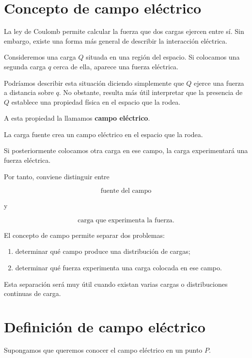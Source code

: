 \section{Concepto de campo eléctrico}

La ley de Coulomb permite calcular la fuerza que dos cargas ejercen entre sí.
Sin embargo, existe una forma más general de describir la interacción eléctrica.

Consideremos una carga \(Q\) situada en una región del espacio. Si colocamos una
segunda carga \(q\) cerca de ella, aparece una fuerza eléctrica.

Podríamos describir esta situación diciendo simplemente que \(Q\) ejerce una
fuerza a distancia sobre \(q\). No obstante, resulta más útil interpretar que la
presencia de \(Q\) establece una propiedad física en el espacio que la rodea.

A esta propiedad la llamamos \textbf{campo eléctrico}.

\begin{idea}

La carga fuente crea un campo eléctrico en el espacio que la rodea.

Si posteriormente colocamos otra carga en ese campo, la carga experimentará
una fuerza eléctrica.

Por tanto, conviene distinguir entre

\[
\boxed{\text{fuente del campo}}
\]

y

\[
\boxed{\text{carga que experimenta la fuerza}}.
\]

\end{idea}

El concepto de campo permite separar dos problemas:

\begin{enumerate}
    \item determinar qué campo produce una distribución de cargas;
    \item determinar qué fuerza experimenta una carga colocada en ese campo.
\end{enumerate}

Esta separación será muy útil cuando existan varias cargas o distribuciones
continuas de carga.


\section{Definición de campo eléctrico}

Supongamos que queremos conocer el campo eléctrico en un punto \(P\).

